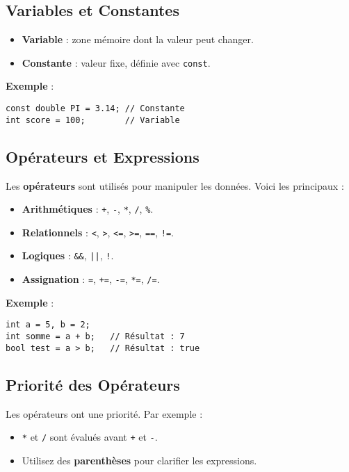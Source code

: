 \subsection{ Variables et Constantes}
\begin{itemize}
    \item \textbf{Variable} : zone mémoire dont la valeur peut changer.
    \item \textbf{Constante} : valeur fixe, définie avec \texttt{const}.
\end{itemize}

\textbf{Exemple} :
\begin{tcolorbox}[colframe=blue!50!black, colback=blue!5!white, title=Exemple de Variables et Constantes]
\begin{verbatim}
const double PI = 3.14; // Constante
int score = 100;        // Variable
\end{verbatim}
\end{tcolorbox}

\subsection{ Opérateurs et Expressions}
Les \textbf{opérateurs} sont utilisés pour manipuler les données. Voici les principaux :
\begin{itemize}
    \item \textbf{Arithmétiques} : \texttt{+}, \texttt{-}, \texttt{*}, \texttt{/}, \texttt{\%}.
    \item \textbf{Relationnels} : \texttt{<}, \texttt{>}, \texttt{<=}, \texttt{>=}, \texttt{==}, \texttt{!=}.
    \item \textbf{Logiques} : \texttt{\&\&}, \texttt{||}, \texttt{!}.
    \item \textbf{Assignation} : \texttt{=}, \texttt{+=}, \texttt{-=}, \texttt{*=}, \texttt{/=}.
\end{itemize}

\textbf{Exemple} :
\begin{tcolorbox}[colframe=blue!50!black, colback=blue!5!white, title=Exemple d'Opérateurs et Expressions]
\begin{verbatim}
int a = 5, b = 2;
int somme = a + b;   // Résultat : 7
bool test = a > b;   // Résultat : true
\end{verbatim}
\end{tcolorbox}

\subsection{ Priorité des Opérateurs}
Les opérateurs ont une priorité. Par exemple :
\begin{itemize}
    \item \texttt{*} et \texttt{/} sont évalués avant \texttt{+} et \texttt{-}.
    \item Utilisez des \textbf{parenthèses} pour clarifier les expressions.
\end{itemize}

